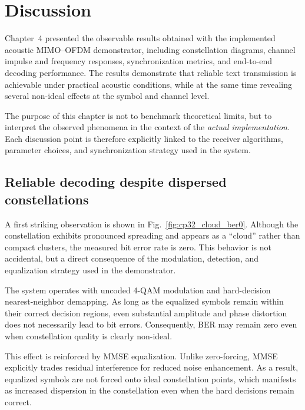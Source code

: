 
\section{Discussion}
\label{sec:discussion}

Chapter~4 presented the observable results obtained with the implemented acoustic MIMO--OFDM demonstrator, including constellation diagrams, channel impulse and frequency responses, synchronization metrics, and end-to-end decoding performance. The results demonstrate that reliable text transmission is achievable under practical acoustic conditions, while at the same time revealing several non-ideal effects at the symbol and channel level.

The purpose of this chapter is not to benchmark theoretical limits, but to interpret the observed phenomena in the context of the \emph{actual implementation}. Each discussion point is therefore explicitly linked to the receiver algorithms, parameter choices, and synchronization strategy used in the system.


\subsection{Reliable decoding despite dispersed constellations}
\label{sec:discussion_ber_constellation}

A first striking observation is shown in Fig.~\ref{fig:cp32_cloud_ber0}. Although the constellation exhibits pronounced spreading and appears as a ``cloud'' rather than compact clusters, the measured bit error rate is zero. This behavior is not accidental, but a direct consequence of the modulation, detection, and equalization strategy used in the demonstrator.

The system operates with uncoded 4-QAM modulation and hard-decision nearest-neighbor demapping. As long as the equalized symbols remain within their correct decision regions, even substantial amplitude and phase distortion does not necessarily lead to bit errors. Consequently, BER may remain zero even when constellation quality is clearly non-ideal.

This effect is reinforced by MMSE equalization. Unlike zero-forcing, MMSE explicitly trades residual interference for reduced noise enhancement. As a result, equalized symbols are not forced onto ideal constellation points, which manifests as increased dispersion in the constellation even when the hard decisions remain correct.

